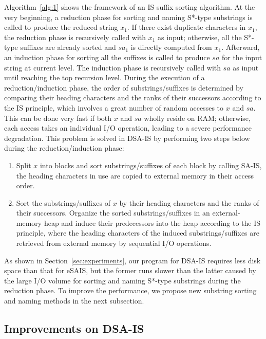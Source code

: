 \documentclass[10pt,journal,compsoc]{IEEEtran}
\begin{document}
Algorithm~\ref{alg:1} shows the framework of an IS suffix sorting algorithm. At the very beginning, a reduction phase for sorting and naming S*-type substrings is called to produce the reduced string $x_1$. If there exist duplicate characters in $x_1$, the reduction phase is recursively called with $x_1$ as input; otherwise, all the S*-type suffixes are already sorted and $sa_1$ is directly computed from $x_1$. 
Afterward, an induction phase for sorting all the suffixes is called to produce $sa$ for the input string at current level. The induction phase is recursively called with $sa$ as input until reaching the top recursion level. During the execution of a reduction/induction phase, the order of substrings/suffixes is determined by comparing their heading characters and the ranks of their successors according to the IS principle, which involves a great number of random accesses to $x$ and $sa$. This can be done very fast if both $x$ and $sa$ wholly reside on RAM; otherwise, each access takes an individual I/O operation, leading to a severe performance degradation. This problem is solved in DSA-IS by performing two steps below during the reduction/induction phase:

\begin{enumerate}[S1]
	\item Split $x$ into blocks and sort substrings/suffixes of each block by calling SA-IS, the heading characters in use are copied to external memory in their access order. \label{dsais_sorting_method:1}
	\item Sort the substrings/suffixes of $x$ by their heading characters and the ranks of their successors. Organize the sorted substrings/suffixes in an external-memory heap and induce their predecessors into the heap according to the IS principle, where the heading characters of the induced substrings/suffixes are retrieved from external memory by sequential I/O operations.\label{dsais_sorting_method:2}
\end{enumerate}

As shown in Section~\ref{sec:experiments}, our program for DSA-IS requires less disk space than that for eSAIS, but the former runs slower than the latter caused by the large I/O volume for sorting and naming S*-type substrings during the reduction phase. To improve the performance, we propose new substring sorting and naming methods in the next subsection.

\subsection{Improvements on DSA-IS}
\end{document}
